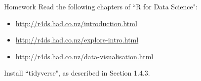 \begin{frame}{Homework}
    Read the following chapters of ``R for Data Science":
    \begin{itemize}
        \item \url{http://r4ds.had.co.nz/introduction.html}
        \item \url{http://r4ds.had.co.nz/explore-intro.html}
        \item \url{http://r4ds.had.co.nz/data-visualisation.html}
    \end{itemize}

    Install ``tidyverse", as described in Section 1.4.3.
\end{frame}